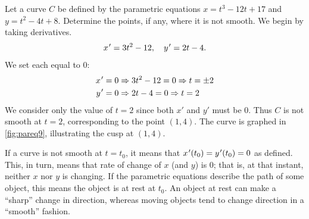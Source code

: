 \begin{example}\label{ex_pareq9}%
Let a curve $C$ be defined by the parametric equations $x=t^3-12t+17$ and $y=t^2-4t+8$. Determine the points, if any, where it is not smooth.
\solution
We begin by taking derivatives.
%
%
\[x\primeskip' = 3t^2-12,\quad y\primeskip' = 2t-4.\]
We set each equal to 0:
\begin{align*}
 x\primeskip' =0 &\Rightarrow 3t^2-12=0 \Rightarrow t=\pm 2\\
 y\primeskip' =0 &\Rightarrow 2t-4 = 0 \Rightarrow t=2
\end{align*}
We consider only the value of $t=2$ since both $x'$ and $y'$ must be 0. Thus $C$ is not smooth at $t=2$, corresponding to the point $(1,4)$. The curve is graphed in \autoref{fig:pareq9}, illustrating the cusp at $(1,4)$.
\end{example}

If a curve is not smooth at $t=t_0$, it means that $x\primeskip'(t_0)=y\primeskip'(t_0)=0$ as defined. This, in turn, means that rate of change of $x$ (and $y$) is 0; that is, at that instant, neither $x$ nor $y$ is changing. If the parametric equations describe the path of some object, this means the object is at rest at $t_0$. An object at rest can make a ``sharp'' change in direction, whereas moving objects tend to change direction in a ``smooth'' fashion.

